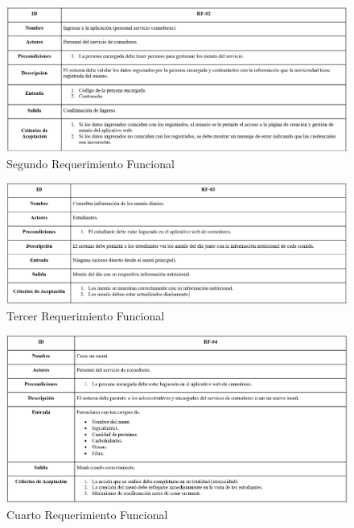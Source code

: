 \documentclass[stu, 12pt, letterpaper, donotrepeattitle, floatsintext, natbib]{apa7}
\begin{document}
\begin{figure}[H]
	\caption[]{Segundo Requerimiento Funcional}
	\label{Segundo Requerimiento Funcional}
	\includegraphics[width=1\linewidth]{Requerimientos Funcionales/2. Requerimiento Funcional.png}
\end{figure}

\begin{figure}[H]
	\caption[]{Tercer Requerimiento Funcional}
	\label{Tercer Requerimiento Funcional}
	\includegraphics[width=1\linewidth]{Requerimientos Funcionales/3. Requerimiento Funcional.png}
\end{figure}

\begin{figure}[H]
	\caption[]{Cuarto Requerimiento Funcional}
	\label{Cuarto Requerimiento Funcional}
	\includegraphics[width=1\linewidth]{Requerimientos Funcionales/4. Requerimiento Funcional.png}
\end{figure}
\end{document}
